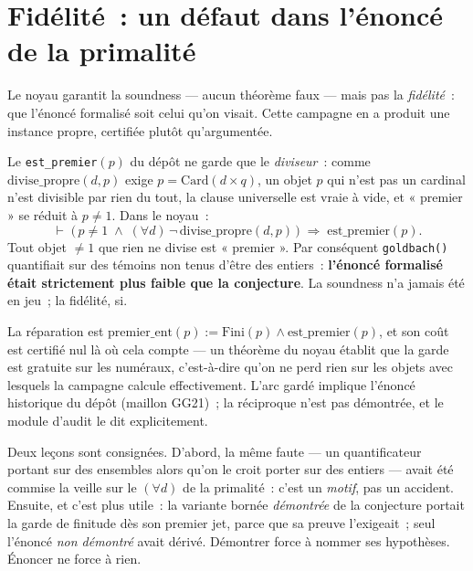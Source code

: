 \documentclass[11pt]{article}
\theoremstyle{remark}\newtheorem{remarque}{Remarque}
\begin{document}
\section{Fidélité~: un défaut dans l'énoncé de la primalité}
\label{sec:fidelity}

Le noyau garantit la soundness --- aucun théorème faux --- mais pas la \emph{fidélité}~:
que l'énoncé formalisé soit celui qu'on visait. Cette campagne en a produit une instance
propre, certifiée plutôt qu'argumentée.

Le \texttt{est\_premier}$(p)$ du dépôt ne garde que le \emph{diviseur}~: comme
$\mathrm{divise\_propre}(d,p)$ exige $p = \mathrm{Card}(d \times q)$, un objet $p$ qui
n'est pas un cardinal n'est divisible par rien du tout, la clause universelle est vraie à
vide, et « premier » se réduit à $p \neq 1$. Dans le noyau~:
\[
\vdash\;\bigl(\,p \neq 1 \;\wedge\; (\forall d)\,\neg\,\mathrm{divise\_propre}(d,p)\,\bigr)
\;\Longrightarrow\; \mathrm{est\_premier}(p).
\]
Tout objet $\neq 1$ que rien ne divise est « premier ». Par conséquent
\texttt{goldbach()} quantifiait sur des témoins non tenus d'être des entiers~:
\textbf{l'énoncé formalisé était strictement plus faible que la conjecture}. La soundness
n'a jamais été en jeu~; la fidélité, si.

La réparation est
$\mathrm{premier\_ent}(p) := \mathrm{Fini}(p) \wedge \mathrm{est\_premier}(p)$, et son
coût est certifié nul là où cela compte --- un théorème du noyau établit que la garde est
gratuite sur les numéraux, c'est-à-dire qu'on ne perd rien sur les objets avec lesquels
la campagne calcule effectivement. L'arc gardé implique l'énoncé historique du dépôt
(maillon GG21)~; la réciproque n'est pas démontrée, et le module d'audit le dit
explicitement.

Deux leçons sont consignées. D'abord, la même faute --- un quantificateur portant sur des
ensembles alors qu'on le croit porter sur des entiers --- avait été commise la veille sur
le $(\forall d)$ de la primalité~: c'est un \emph{motif}, pas un accident. Ensuite, et
c'est plus utile~: la variante bornée \emph{démontrée} de la conjecture portait la garde
de finitude dès son premier jet, parce que sa preuve l'exigeait~; seul l'énoncé \emph{non
démontré} avait dérivé. Démontrer force à nommer ses hypothèses. Énoncer ne force à rien.

\end{document}
